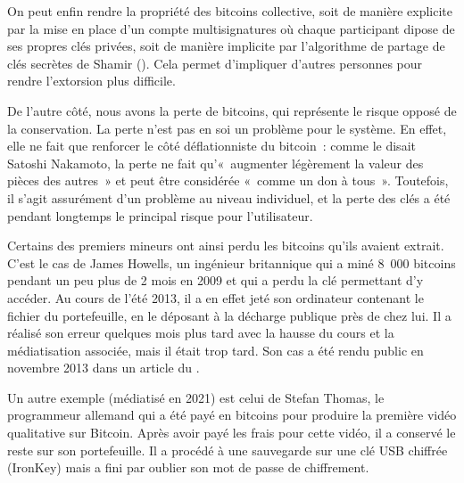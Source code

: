 On peut enfin rendre la propriété des bitcoins collective, soit de manière explicite par la mise en place d'un compte multisignatures où chaque participant dipose de ses propres clés privées, soit de manière implicite par l'algorithme de partage de clés secrètes de Shamir (). Cela permet d'impliquer d'autres personnes pour rendre l'extorsion plus difficile. 

De l'autre côté, nous avons la perte de bitcoins, qui représente le risque opposé de la conservation. La perte n'est pas en soi un problème pour le système. En effet, elle ne fait que renforcer le côté déflationniste du bitcoin~: comme le disait Satoshi Nakamoto, la perte ne fait qu'«~augmenter légèrement la valeur des pièces des autres~» et peut être considérée «~comme un don à tous~». Toutefois, il s'agit assurément d'un problème au niveau individuel, et la perte des clés a été pendant longtemps le principal risque pour l'utilisateur.

Certains des premiers mineurs ont ainsi perdu les bitcoins qu'ils avaient extrait. C'est le cas de James Howells, un ingénieur britannique qui a miné 8~000 bitcoins pendant un peu plus de 2 mois en 2009 et qui a perdu la clé permettant d'y accéder. Au cours de l'été 2013, il a en effet jeté son ordinateur contenant le fichier du portefeuille, en le déposant à la décharge publique près de chez lui. Il a réalisé son erreur quelques mois plus tard avec la hausse du cours et la médiatisation associée, mais il était trop tard. Son cas a été rendu public en novembre 2013 dans un article du .

Un autre exemple (médiatisé en 2021) est celui de Stefan Thomas, le programmeur allemand qui a été payé en bitcoins pour produire la première vidéo qualitative sur Bitcoin. Après avoir payé les frais pour cette vidéo, il a conservé le reste sur son portefeuille. Il a procédé à une sauvegarde sur une clé USB chiffrée (IronKey) mais a fini par oublier son mot de passe de chiffrement.

